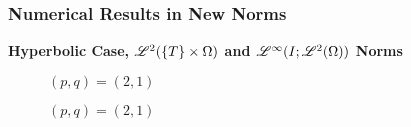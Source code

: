 \begin{frame}
    \frametitle{Numerical Results in New Norms}

    \vspace*{\fill}
    \begin{center}
        {\color{\accentcolor} \Large \textbf{Hyperbolic Case, $\mathscr{L}^{2}(\left\{ T \right\} \times \Omega)$ and $\mathscr{L}^{\infty}(I; \mathscr{L}^{2}(\Omega))$ Norms}}
    \end{center}

    \vspace*{\fill}

    \begin{multicols}{2}

        \begin{center}
            \begin{minipage}{0.45\textwidth}
                \begin{figure}[!ht]
                    \caption{$\left( p, q  \right) = \left( 2, 1  \right)$}
                    \label{fig:p_2_1_hyp_l2T}
                    
                \end{figure}
            \end{minipage}
        \end{center}
        \vspace*{\fill}

        \vfill\null
        \columnbreak

        \begin{center}
            \begin{minipage}{0.45\textwidth}
                \begin{figure}[!ht]
                    \caption{$\left( p, q  \right) = \left( 2, 1  \right)$}
                    \label{fig:p_2_1_hyp_linfl2}
                    
                \end{figure}
            \end{minipage}
        \end{center}
        \vspace*{\fill}

    \end{multicols}
    \vspace*{\fill}
    
\end{frame}